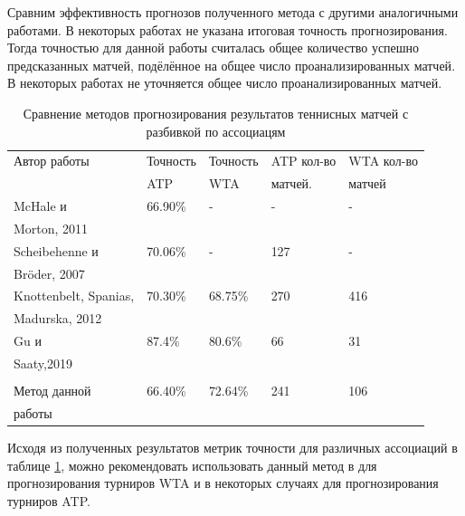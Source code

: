 Сравним эффективность прогнозов полученного метода с другими аналогичными работами.
В некоторых работах не указана итоговая точность прогнозирования. Тогда точностью для данной работы считалась общее количество успешно предсказанных матчей, подёлённое на общее число проанализированных матчей\cite{Book40}. В некоторых работах не уточняется общее число проанализированных матчей.
	
\begin{table}[!h]
	\begin{center}
		\begin{tabular}{|l|l|l|l|l|}
			\hline
			
			Автор работы& Точность  & Точность&ATP кол-во  & WTA кол-во \\
			& ATP & WTA&матчей. & матчей \\
			\hline 
			
			McHale и &66.90\%& - & - & -  \\
			Morton, 2011  \cite{Book18} & & & &  \\
			\hline
			Scheibehenne и  & 70.06\% & - & 127 & -  \\
			Bröder,
			2007\cite{Book40} &&&& \\
			\hline
			Knottenbelt, Spanias,& 70.30\% & 68.75\% & 270& 416	\\		Madurska, 2012\cite{Book41} & & && \\
			\hline
			Gu и  &87.4\%& 80.6\%&66&31\\
			Saaty,2019\cite{Book42}&&&&\\
			\hline
			&&&&\\
			Метод данной &66.40\%& 72.64\%&241&106\\
			работы &&&&\\
			\hline
			
			
		\end{tabular}
	\end{center}
	\caption{Сравнение методов прогнозирования результатов теннисных матчей с разбивкой по ассоциацям}		
	\label{tab:issled2}
\end{table}


Исходя из полученных результатов метрик точности для различных ассоциаций в таблице \ref{tab:issled2}, можно рекомендовать использовать данный метод в для прогнозирования турниров WTA и в некоторых случаях для прогнозирования турниров ATP.
